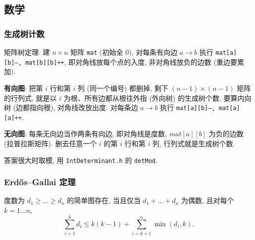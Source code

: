 \subsection{数学}
	\subsubsection{生成树计数}
		矩阵树定理. 建 $n\times n$ 矩阵 \texttt{mat} (初始全 0), 对每条有向边 $a\to b$ 执行
		\texttt{mat[a][b]--, mat[b][b]++}, 即对角线放每个点的入度, 非对角线放负的边数 (重边要累加).
		\begin{compactitem}
		\item \textbf{有向图}: 把第 $i$ 行和第 $i$ 列 (同一个编号) 都删掉, 剩下 $(n-1)\times(n-1)$ 矩阵的行列式, 就是以 $i$ 为根、所有边都从根往外指 (外向树) 的生成树个数. 要算内向树 (边都指向根), 对角线改放出度: 对每条边 $a\to b$ 执行 \texttt{mat[a][b]--, mat[a][a]++}.
		\item \textbf{无向图}: 每条无向边当作两条有向边, 即对角线是度数, $\mathit{mat}[a][b]$ 为负的边数 (拉普拉斯矩阵). 删去任意一个 $i$ 的第 $i$ 行和第 $i$ 列, 行列式就是生成树个数.
		\item 答案很大时取模, 用 \texttt{IntDeterminant.h} 的 \texttt{detMod}.
		\end{compactitem}

	\subsubsection{Erdős–Gallai 定理}
		度数为 $d_1 \ge \dots \ge d_n$ 的简单图存在, 当且仅当 $d_1 + \dots + d_n$ 为偶数, 且对每个 $k = 1\dots n$,
		\[ \sum _{i=1}^{k}d_{i}\leq k(k-1)+\sum _{i=k+1}^{n}\min(d_{i},k). \]
